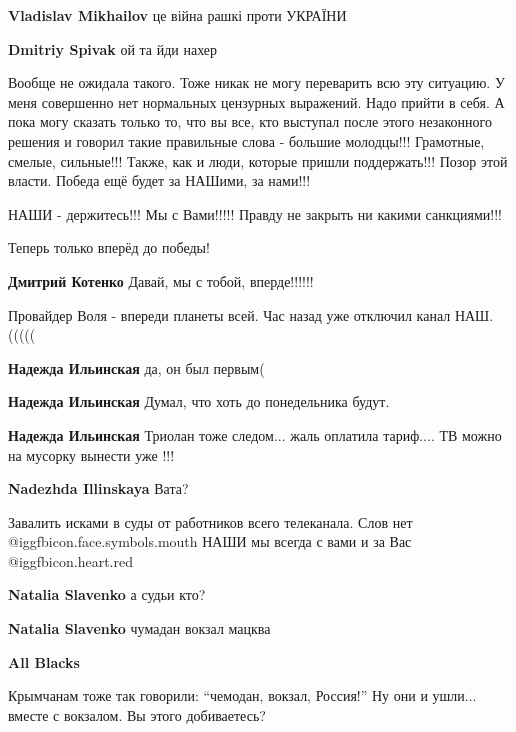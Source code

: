 \begin{itemize}
\begin{itemize}
\textbf{Vladislav Mikhailov} це війна рашкі проти УКРАЇНИ

\textbf{Dmitriy Spivak} ой та йди нахер

\end{itemize} %


Вообще не ожидала такого. Тоже никак не могу переварить всю эту ситуацию. У
меня совершенно нет нормальных цензурных выражений. Надо прийти в себя. А пока
могу сказать только то, что вы все, кто выступал после этого незаконного
решения и говорил такие правильные слова - большие молодцы!!! Грамотные,
смелые, сильные!!! Также, как и люди, которые пришли поддержать!!! Позор этой
власти. Победа ещё будет за НАШими, за нами!!!

НАШИ - держитесь!!!
Мы с Вами!!!!!
Правду не закрыть ни какими санкциями!!!

Теперь только вперёд до победы!

\textbf{Дмитрий Котенко} Давай, мы с тобой, вперде!!!!!!

Провайдер Воля - впереди планеты всей. Час назад уже отключил канал НАШ.(((((

\begin{itemize} %
\textbf{Надежда Ильинская} да, он был первым(

\textbf{Надежда Ильинская}
Думал, что хоть до понедельника будут.

\textbf{Надежда Ильинская} Триолан тоже следом... жаль оплатила тариф.... ТВ можно на мусорку вынести уже !!!

\textbf{Nadezhda Illinskaya} Вата?
\end{itemize} %

Завалить исками в суды от работников всего телеканала.
Слов нет @igg{fbicon.face.symbols.mouth} 
НАШИ мы всегда с вами и за Вас @igg{fbicon.heart.red}

\begin{itemize} %
\textbf{Natalia Slavenko} а судьи кто?

\textbf{Natalia Slavenko} чумадан вокзал мацква

\textbf{All Blacks} 

Крымчанам тоже так говорили: \enquote{чемодан, вокзал, Россия!} Ну они и
ушли... вместе с вокзалом. Вы этого добиваетесь?


\end{itemize}
\end{itemize}
